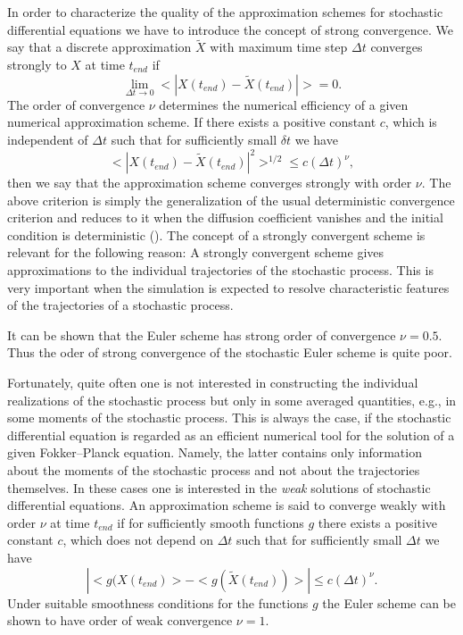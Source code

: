 In order to characterize the quality of the approximation schemes 
for stochastic differential equations we have to introduce the 
concept of strong convergence. We say that a discrete 
approximation $\tilde{X}$ with maximum time step $\Delta t$
converges strongly to $X$ at time $t_{end}$ if
\begin{equation*}
\lim_{\Delta t \rightarrow 0} <|X(t_{end}) - \tilde{X}(t_{end})|> 
=0.
\end{equation*}
The order of convergence $\nu$ determines the numerical efficiency
of a given numerical approximation scheme. If there exists a 
positive constant $c$, which is independent of $\Delta t$ such 
that for sufficiently small $\delta t$ we have
\begin{equation*}
<|X(t_{end}) - \tilde{X}(t_{end})|^2>^{1/2} \le c (\Delta t)^{\nu},
\end{equation*}
then we say that the approximation scheme converges strongly with
order $\nu$. 
The above criterion is simply the generalization of the usual 
deterministic convergence criterion and reduces to it when the 
diffusion coefficient vanishes and the initial condition is
deterministic (\cite{KLOEDEN}). 
The concept of a strongly  convergent scheme is relevant for the
following reason: A strongly convergent scheme gives 
approximations to the individual trajectories of the 
stochastic process. This is very important when the simulation is 
expected to resolve characteristic features of the trajectories of 
a stochastic process.

It can be shown that the Euler scheme  has strong 
order of convergence $\nu = 0.5$. Thus the oder of strong 
convergence of the stochastic Euler scheme is quite poor.

Fortunately, quite often one is not interested in constructing the 
individual realizations of the stochastic process but only in some 
averaged quantities, e.g., in some moments of the stochastic 
process. This is always the case, if the stochastic differential 
equation is regarded as an efficient numerical tool for the
solution of a given Fokker--Planck equation. Namely, the latter 
contains only information about the moments of the stochastic 
process and not about the trajectories themselves. In these cases
one is interested in the {\em weak} solutions of stochastic 
differential equations. An approximation scheme is said to 
converge weakly with order $\nu$ at time $t_{end}$ if for 
sufficiently smooth functions $g$ there exists a positive constant 
$c$, which does not depend on $\Delta t$ such that for 
sufficiently small $\Delta t$ we have
\begin{equation*}
|<g(X(t_{end})> - <g(\tilde{X}(t_{end}))>| \le c (\Delta t)^{\nu}.
\end{equation*}
Under suitable smoothness conditions for the functions $g$ the 
Euler scheme can be shown to have order of weak convergence 
$\nu=1$.

